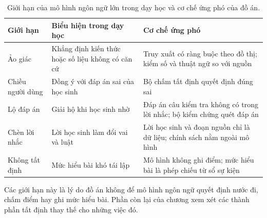 \begin{table}[ht]
\centering
\caption{Giới hạn của mô hình ngôn ngữ lớn trong dạy học và cơ chế ứng phó của đồ án.}
\label{tab:llm-limits}
\small
\begin{tabularx}{\linewidth}{@{}p{3.2cm}XX@{}}
\toprule
Giới hạn & Biểu hiện trong dạy học & Cơ chế ứng phó \\
\midrule
Ảo giác & Khẳng định kiến thức hoặc số liệu không có căn cứ & Truy xuất có ràng buộc theo đồ thị; kiểm số và thuật ngữ so với nguồn \\
Chiều người dùng & Đồng ý với đáp án sai của học sinh & Bộ chấm tất định quyết định đúng sai \\
Lộ đáp án & Giải hộ khi học sinh nhờ & Đáp án câu kiểm tra không có trong lời nhắc; bộ kiểm chứng quét đáp án \\
Chèn lời nhắc & Lời học sinh làm đổi vai và luật & Lời học sinh và đoạn nguồn chỉ là dữ liệu; chính sách nằm ngoài mô hình \\
Không tất định & Mức hiểu bài khó tái lập & Mô hình không ghi điểm; mức hiểu bài là phép chiếu từ sổ sự kiện \\
\bottomrule
\end{tabularx}
\end{table}

Các giới hạn này là lý do đồ án không để mô hình ngôn ngữ quyết định nước đi, chấm điểm hay ghi mức hiểu bài. Phần còn lại của chương xem xét các thành phần tất định thay thế cho những việc đó.
